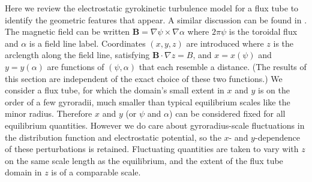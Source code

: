 \documentclass{jpp}
\begin{document}
Here we review the electrostatic gyrokinetic turbulence model for a flux tube to identify the geometric features that appear.
A similar discussion can be found in \cite{jorge2020use}.
The magnetic field can be written $\mathbf{B}=\nabla\psi\times\nabla\alpha$ where $2\pi\psi$ is the toroidal flux and $\alpha$ is a field line label.
Coordinates $(x,y,z)$ are introduced where $z$ is the arclength along the field line, satisfying $\mathbf{B}\cdot\nabla z=B$, and $x=x(\psi)$ and $y=y(\alpha)$ are functions of $(\psi,\alpha)$ that each resemble a distance. 
(The results of this section are independent of the exact choice of these two functions.)
We consider a flux tube, for which the domain's small extent in $x$ and $y$ is on the order of a few gyroradii, much smaller than typical equilibrium scales like the minor radius.
Therefore $x$ and $y$ (or $\psi$ and $\alpha$) can be considered fixed for all equilibrium quantities.
However we do care about gyroradius-scale fluctuations in the distribution function and electrostatic potential, so the $x$- and $y$-dependence of these perturbations is retained.
Fluctuating quantities are taken to vary with $z$ on the same scale length as the equilibrium, and the extent of the flux tube domain in $z$ is of a comparable scale.
\end{document}
